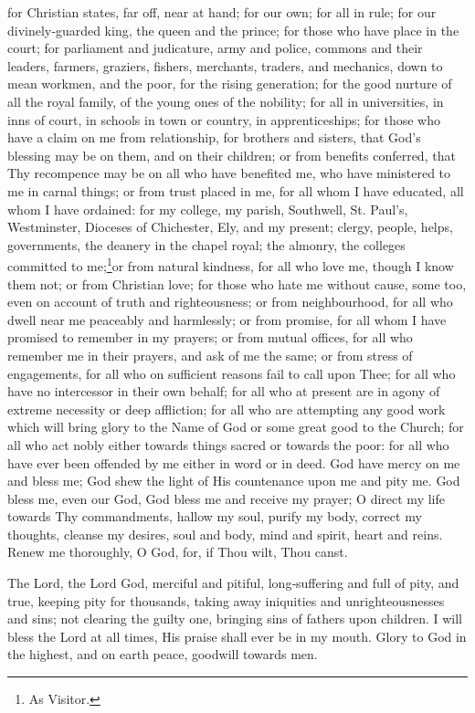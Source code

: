 for Christian states, far off, near at hand; for our own; for all in rule; for our divinely‑guarded king, the queen and the prince; for those who have place in the court; for parliament and judicature, army and police, commons and their leaders, farmers, graziers, fishers, merchants, traders, and mechanics, down to mean workmen, and the poor, for the rising generation; for the good nurture of all the royal family, of the young ones of the nobility; for all in universities, in inns of court, in schools in town or country, in apprenticeships; for those who have a claim on me from relationship, for brothers and sisters, that God’s blessing may be on them, and on their children; or from benefits conferred, that Thy recompence may be on all who have benefited me, who have ministered to me in carnal things; or from trust placed in me, for all whom I have educated, all whom I have ordained: for my college, my parish, Southwell, St. Paul’s, Westminster, Dioceses of Chichester, Ely, and my present; clergy, people, helps, governments, the deanery in the chapel royal; the almonry, the colleges committed to me;\footnote{As Visitor.}or from natural kindness, for all who love me, though I know them not; or from Christian love; for those who hate me without cause, some too, even on account of truth and righteousness; or from neighbourhood, for all who dwell near me peaceably and harmlessly; or from promise, for all whom I have promised to remember in my prayers; or from mutual offices, for all who remember me in their prayers, and ask of me the same; or from stress of engagements, for all who on sufficient reasons fail to call upon Thee; for all who have no intercessor in their own behalf; for all who at present are in agony of extreme necessity or deep affliction; for all who are attempting any good work which will bring glory to the Name of God or some great good to the Church; for all who act nobly either towards things sacred or towards the poor: for all who have ever been offended by me either in word or in deed. God have mercy on me and bless me; God shew the light of His countenance upon me and pity me. God bless me, even our God, God bless me and receive my prayer; O direct my life towards Thy commandments, hallow my soul, purify my body, correct my thoughts, cleanse my desires, soul and body, mind and spirit, heart and reins. Renew me thoroughly, O God, for, if Thou wilt, Thou canst.


The Lord, the Lord God, merciful and pitiful, long‑suffering and full of pity, and true, keeping pity for thousands, taking away iniquities and unrighteousnesses and sins; not clearing the guilty one, bringing sins of fathers upon children. I will bless the Lord at all times, His praise shall ever be in my mouth. Glory to God in the highest, and on earth peace, goodwill towards men.

